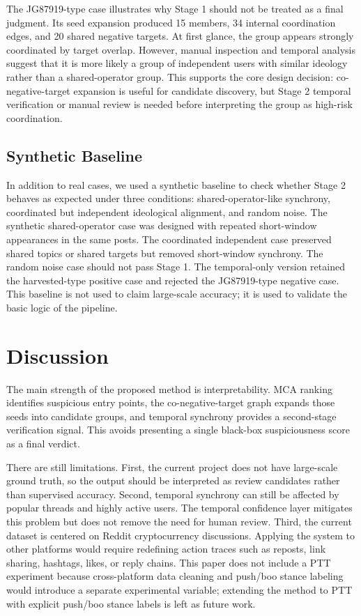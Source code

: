 \documentclass[conference]{IEEEtran}
\begin{document}
The JG87919-type case illustrates why Stage 1 should not be treated as a final judgment. Its seed expansion produced 15 members, 34 internal coordination edges, and 20 shared negative targets. At first glance, the group appears strongly coordinated by target overlap. However, manual inspection and temporal analysis suggest that it is more likely a group of independent users with similar ideology rather than a shared-operator group. This supports the core design decision: co-negative-target expansion is useful for candidate discovery, but Stage 2 temporal verification or manual review is needed before interpreting the group as high-risk coordination.

\subsection{Synthetic Baseline}

In addition to real cases, we used a synthetic baseline to check whether Stage 2 behaves as expected under three conditions: shared-operator-like synchrony, coordinated but independent ideological alignment, and random noise. The synthetic shared-operator case was designed with repeated short-window appearances in the same posts. The coordinated independent case preserved shared topics or shared targets but removed short-window synchrony. The random noise case should not pass Stage 1. The temporal-only version retained the harvested-type positive case and rejected the JG87919-type negative case. This baseline is not used to claim large-scale accuracy; it is used to validate the basic logic of the pipeline.

\section{Discussion}

The main strength of the proposed method is interpretability. MCA ranking identifies suspicious entry points, the co-negative-target graph expands those seeds into candidate groups, and temporal synchrony provides a second-stage verification signal. This avoids presenting a single black-box suspiciousness score as a final verdict.

There are still limitations. First, the current project does not have large-scale ground truth, so the output should be interpreted as review candidates rather than supervised accuracy. Second, temporal synchrony can still be affected by popular threads and highly active users. The temporal confidence layer mitigates this problem but does not remove the need for human review. Third, the current dataset is centered on Reddit cryptocurrency discussions. Applying the system to other platforms would require redefining action traces such as reposts, link sharing, hashtags, likes, or reply chains. This paper does not include a PTT experiment because cross-platform data cleaning and push/boo stance labeling would introduce a separate experimental variable; extending the method to PTT with explicit push/boo stance labels is left as future work.
\end{document}
